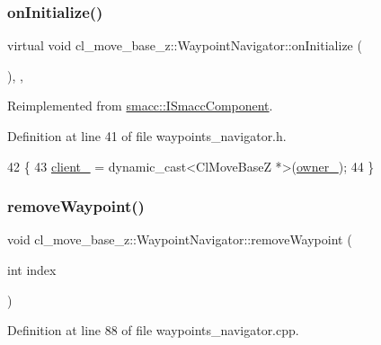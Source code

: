 \subsubsection{\texorpdfstring{on\+Initialize()}{onInitialize()}}
{\footnotesize\ttfamily virtual void cl\+\_\+move\+\_\+base\+\_\+z\+::\+Waypoint\+Navigator\+::on\+Initialize (\begin{DoxyParamCaption}{ }\end{DoxyParamCaption})\hspace{0.3cm}{\ttfamily [inline]}, {\ttfamily [override]}, {\ttfamily [virtual]}}



Reimplemented from \hyperlink{classsmacc_1_1ISmaccComponent_ae6f71d008db12553912e9436184b9e65}{smacc\+::\+I\+Smacc\+Component}.



Definition at line 41 of file waypoints\+\_\+navigator.\+h.


\begin{DoxyCode}
42   \{
43     \hyperlink{classcl__move__base__z_1_1WaypointNavigator_afc5ad5c5d15f41437286b8fca1d3a324}{client\_} = \textcolor{keyword}{dynamic\_cast<}ClMoveBaseZ *\textcolor{keyword}{>}(\hyperlink{classsmacc_1_1ISmaccComponent_a909590e672450ce0eb0d8facb45c737a}{owner\_});
44   \}
\end{DoxyCode}
\mbox{\label{classcl__move__base__z_1_1WaypointNavigator_a0a7e9e35ed5ba02ff4cfb580ffa25e9a}} 
\subsubsection{\texorpdfstring{remove\+Waypoint()}{removeWaypoint()}}
{\footnotesize\ttfamily void cl\+\_\+move\+\_\+base\+\_\+z\+::\+Waypoint\+Navigator\+::remove\+Waypoint (\begin{DoxyParamCaption}\item[{int}]{index }\end{DoxyParamCaption})}



Definition at line 88 of file waypoints\+\_\+navigator.\+cpp.



